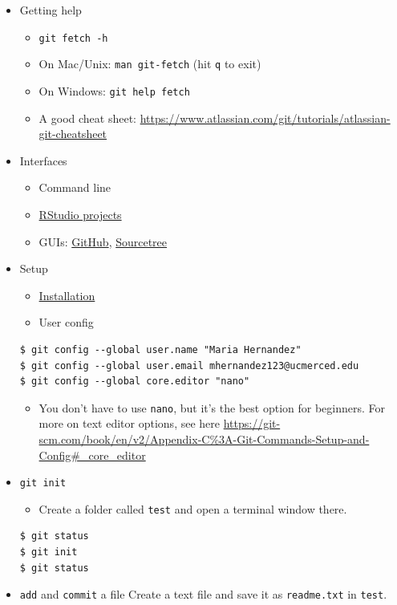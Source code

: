 \documentclass[
]{article}
\providecommand{\tightlist}{%
  \setlength{\itemsep}{0pt}\setlength{\parskip}{0pt}}
\begin{document}
\begin{itemize}
\tightlist
\item
  Getting help

  \begin{itemize}
  \tightlist
  \item
    \texttt{git\ fetch\ -h}
  \item
    On Mac/Unix: \texttt{man\ git-fetch} (hit \texttt{q} to exit)
  \item
    On Windows: \texttt{git\ help\ fetch}
  \item
    A good cheat sheet: \url{https://www.atlassian.com/git/tutorials/atlassian-git-cheatsheet}
  \end{itemize}
\item
  Interfaces

  \begin{itemize}
  \tightlist
  \item
    Command line
  \item
    \href{https://support.rstudio.com/hc/en-us/articles/200526207-Using-Projects}{RStudio projects}
  \item
    GUIs: \href{https://desktop.github.com/}{GitHub}, \href{https://www.sourcetreeapp.com/}{Sourcetree}
  \end{itemize}
\item
  Setup

  \begin{itemize}
  \tightlist
  \item
    \href{https://git-scm.com/book/en/v2/Getting-Started-Installing-Git}{Installation}
  \item
    User config
  \end{itemize}

\begin{verbatim}
$ git config --global user.name "Maria Hernandez"
$ git config --global user.email mhernandez123@ucmerced.edu
$ git config --global core.editor "nano"
\end{verbatim}

  \begin{itemize}
  \tightlist
  \item
    You don't have to use \texttt{nano}, but it's the best option for beginners. For more on text editor options, see here \url{https://git-scm.com/book/en/v2/Appendix-C\%3A-Git-Commands-Setup-and-Config\#_core_editor}
  \end{itemize}
\item
  \texttt{git\ init}

  \begin{itemize}
  \tightlist
  \item
    Create a folder called \texttt{test} and open a terminal window there.\\
  \end{itemize}

\begin{verbatim}
$ git status
$ git init
$ git status
\end{verbatim}
\item
  \texttt{add} and \texttt{commit} a file
  Create a text file and save it as \texttt{readme.txt} in \texttt{test}.\\
\end{itemize}
\end{document}
